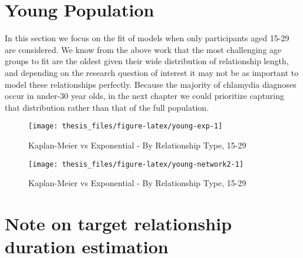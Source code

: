 \documentclass [11pt, proquest] {uwthesis}[2015/03/03]
\begin{document}
\section{Young Population}\label{young-population}

In this section we focus on the fit of models when only participants
aged 15-29 are considered. We know from the above work that the most
challenging age groups to fit are the oldest given their wide
distribution of relationship length, and depending on the research
question of interest it may not be as important to model these
relationships perfectly. Because the majority of chlamydia diagnoses
occur in under-30 year olds, in the next chapter we could prioritize
capturing that distribution rather than that of the full population.
\begin{figure}

{\centering \texttt{[image: thesis\_files/figure-latex/young-exp-1]} 

}

\caption{Kaplan-Meier vs Exponential - By Relationship Type, 15-29}\label{fig:young-exp}
\end{figure}
\begin{figure}

{\centering \texttt{[image: thesis\_files/figure-latex/young-network2-1]} 

}

\caption{Kaplan-Meier vs Exponential - By Relationship Type, 15-29}\label{fig:young-network2}
\end{figure}
\section{Note on target relationship duration
estimation}\label{note-on-target-relationship-duration-estimation}
\end{document}
